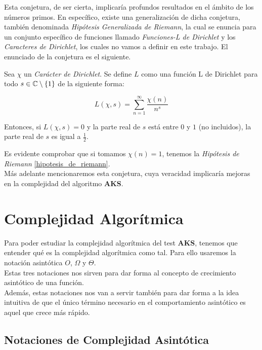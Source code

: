 Esta conjetura, de ser cierta, implicaría profundos resultados en el ámbito de los números primos. En específico, existe una generalización de dicha conjetura, también denominada \textit{Hipótesis Generalizada de Riemann}, la cual se enuncia para un conjunto específico de funciones llamado \textit{Funciones-L de Dirichlet} y los \textit{Caracteres de Dirichlet}, los cuales no vamos a definir en este trabajo. El enunciado de la conjetura es el siguiente.

\begin{conjetura}\label{hipotesis_generalizada_de_riemann}
	Sea $\chi$ un \textit{Carácter de Dirichlet}. Se define $L$ como una función L de Dirichlet para todo $s \in \mathbb{C} \setminus \{1\}$ de la siguiente forma:
	
	\begin{equation}
	L(\chi, s) = \sum_{n=1}^{\infty}\frac{\chi(n)}{n^s}
	\end{equation}
	
	Entonces, si $L(\chi, s) = 0$ y la parte real de $s$ está entre $0$ y $1$ (no incluidos), la parte real de $s$ es igual a $\frac{1}{2}$.
\end{conjetura}

Es evidente comprobar que si tomamos $\chi(n) = 1$, tenemos la \textit{Hipótesis de Riemann} \ref{hipotesis_de_riemann}.\\

Más adelante mencionaremos esta conjetura, cuya veracidad implicaría mejoras en la complejidad del algoritmo \textbf{AKS}.

\section{Complejidad Algorítmica}

Para poder estudiar la complejidad algorítmica del test \textbf{AKS}, tenemos que entender qué es la complejidad algorítmica como tal. Para ello usaremos la notación asintótica $O$, $\Omega$ y $\Theta$.\\

Estas tres notaciones nos sirven para dar forma al concepto de crecimiento asintótico de una función.\\

Además, estas notaciones nos van a servir también para dar forma a la idea intuitiva de que el único término necesario en el comportamiento asintótico es aquel que crece más rápido.

\subsection{Notaciones de Complejidad Asintótica}


